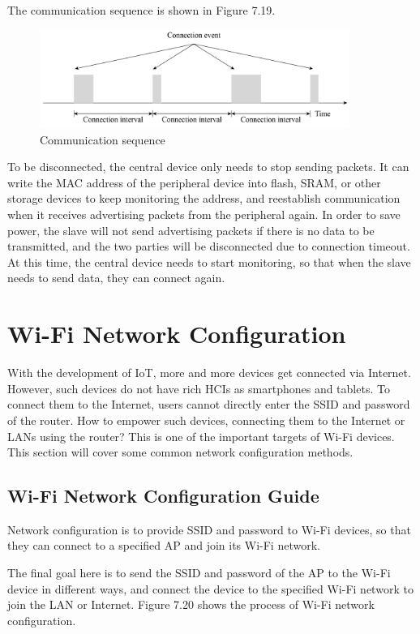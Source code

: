 \documentclass[a4paper,12pt,openany]{book}
\begin{document}
\begin{enumerate}[label=(\arabic*)]
    The communication sequence is shown in Figure 7.19.

    \begin{figure}[!h]
        \centering
        \includegraphics[width=0.9\textwidth]{D7Z/7-19}
        \caption{Communication sequence}
    \end{figure}
\end{enumerate}

To be disconnected, the central device only needs to stop sending packets. It can write the MAC address of the peripheral device into flash, SRAM, or other storage devices to keep monitoring the address, and reestablish communication when it receives advertising packets from the peripheral again. In order to save power, the slave will not send advertising packets if there is no data to be transmitted, and the two parties will be disconnected due to connection timeout. At this time, the central device needs to start monitoring, so that when the slave needs to send data, they can connect again.

\section{Wi-Fi Network Configuration}
With the development of IoT, more and more devices get connected via Internet. However, such devices do not have rich HCIs as smartphones and tablets. To connect them to the Internet, users cannot directly enter the SSID and password of the router. How to empower such devices, connecting them to the Internet or LANs using the router? This is one of the important targets of Wi-Fi devices. This section will cover some common network configuration methods.

\subsection{Wi-Fi Network Configuration Guide}
Network configuration is to provide SSID and password to Wi-Fi devices, so that they can connect to a specified AP and join its Wi-Fi network.

The final goal here is to send the SSID and password of the AP to the Wi-Fi device in different ways, and connect the device to the specified Wi-Fi network to join the LAN or Internet. Figure 7.20 shows the process of Wi-Fi network configuration.
\end{document}
